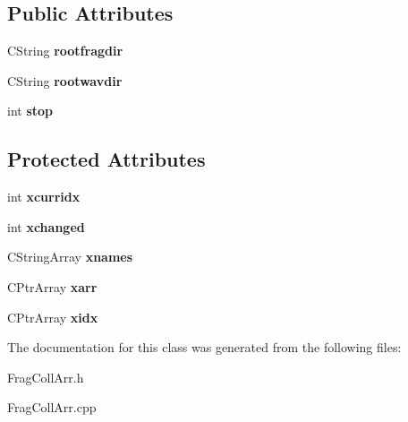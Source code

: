 \subsection*{Public Attributes}
\begin{DoxyCompactItemize}
\item 
\hypertarget{class_c_frag_coll_arr_a967f28782688234227d1bdf456cceb4b}{C\-String {\bfseries rootfragdir}}\label{class_c_frag_coll_arr_a967f28782688234227d1bdf456cceb4b}

\item 
\hypertarget{class_c_frag_coll_arr_a68f39f801a63620746accd44c7c52b1a}{C\-String {\bfseries rootwavdir}}\label{class_c_frag_coll_arr_a68f39f801a63620746accd44c7c52b1a}

\item 
\hypertarget{class_c_frag_coll_arr_ae1bb58feda2ce14ca2f2ce3820e1b399}{int {\bfseries stop}}\label{class_c_frag_coll_arr_ae1bb58feda2ce14ca2f2ce3820e1b399}

\end{DoxyCompactItemize}
\subsection*{Protected Attributes}
\begin{DoxyCompactItemize}
\item 
\hypertarget{class_c_frag_coll_arr_a91bdb7292b1c7ee181b598e5719e983c}{int {\bfseries xcurridx}}\label{class_c_frag_coll_arr_a91bdb7292b1c7ee181b598e5719e983c}

\item 
\hypertarget{class_c_frag_coll_arr_a9b6d428d3d731a9a30262ecbd0ef47bf}{int {\bfseries xchanged}}\label{class_c_frag_coll_arr_a9b6d428d3d731a9a30262ecbd0ef47bf}

\item 
\hypertarget{class_c_frag_coll_arr_afa1ef54aa0dca205ab0bc4f14977d948}{C\-String\-Array {\bfseries xnames}}\label{class_c_frag_coll_arr_afa1ef54aa0dca205ab0bc4f14977d948}

\item 
\hypertarget{class_c_frag_coll_arr_ac2f4c51f44074a7cdea2cda6fd9e7386}{C\-Ptr\-Array {\bfseries xarr}}\label{class_c_frag_coll_arr_ac2f4c51f44074a7cdea2cda6fd9e7386}

\item 
\hypertarget{class_c_frag_coll_arr_a64603a3cee36678de168c4e584e91668}{C\-Ptr\-Array {\bfseries xidx}}\label{class_c_frag_coll_arr_a64603a3cee36678de168c4e584e91668}

\end{DoxyCompactItemize}


The documentation for this class was generated from the following files\-:\begin{DoxyCompactItemize}
\item 
Frag\-Coll\-Arr.\-h\item 
Frag\-Coll\-Arr.\-cpp\end{DoxyCompactItemize}
